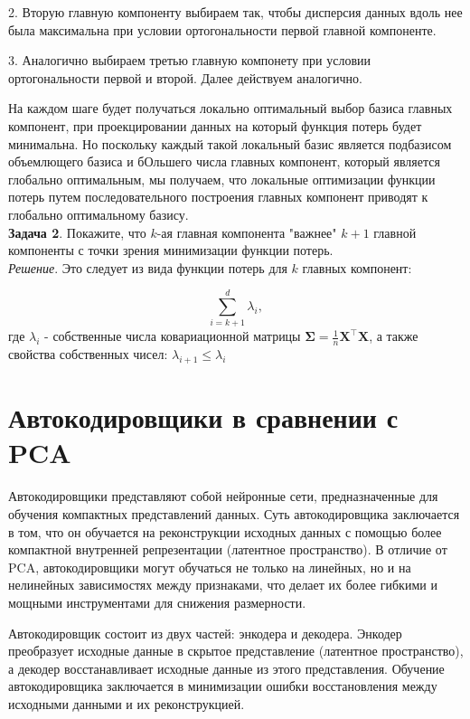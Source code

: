 \documentclass{article}
\begin{document}
2. Вторую главную компоненту выбираем так, чтобы дисперсия данных вдоль нее была максимальна при условии ортогональности первой главной компоненте.

3. Аналогично выбираем третью главную компонету при условии ортогональности первой и второй. Далее действуем аналогично.


На каждом шаге будет получаться локально оптимальный выбор базиса главных компонент, при проекцировании данных на который функция потерь будет минимальна. Но поскольку каждый такой локальный базис является подбазисом объемлющего базиса и бОльшего числа главных компонент, который является глобально оптимальным, мы получаем, что локальные оптимизации функции потерь путем последовательного построения главных компонент приводят к глобально оптимальному базису.\\

\textbf{Задача 2}. Покажите, что $k$-ая главная компонента "важнее"  $k+1$ главной компоненты с точки зрения минимизации функции потерь.\\

\textit{Решение}. Это следует из вида функции потерь для $k$ главных компонент:

\[
\sum_{i=k+1}^d \lambda_i,
\]
где $\lambda_i$ - собственные числа ковариационной матрицы $\mathbf{\Sigma} = \frac{1}{n} \mathbf{X}^\top \mathbf{X}$, а также свойства собственных чисел: $ \lambda_{i+1} \leq \lambda_i$

\section{Автокодировщики в сравнении с PCA}

Автокодировщики представляют собой нейронные сети, предназначенные для обучения компактных представлений данных. Суть автокодировщика заключается в том, что он обучается на реконструкции исходных данных с помощью более компактной внутренней репрезентации (латентное пространство). В отличие от PCA, автокодировщики могут обучаться не только на линейных, но и на нелинейных зависимостях между признаками, что делает их более гибкими и мощными инструментами для снижения размерности.

Автокодировщик состоит из двух частей: энкодера и декодера. Энкодер преобразует исходные данные в скрытое представление (латентное пространство), а декодер восстанавливает исходные данные из этого представления. Обучение автокодировщика заключается в минимизации ошибки восстановления между исходными данными и их реконструкцией.
\end{document}
